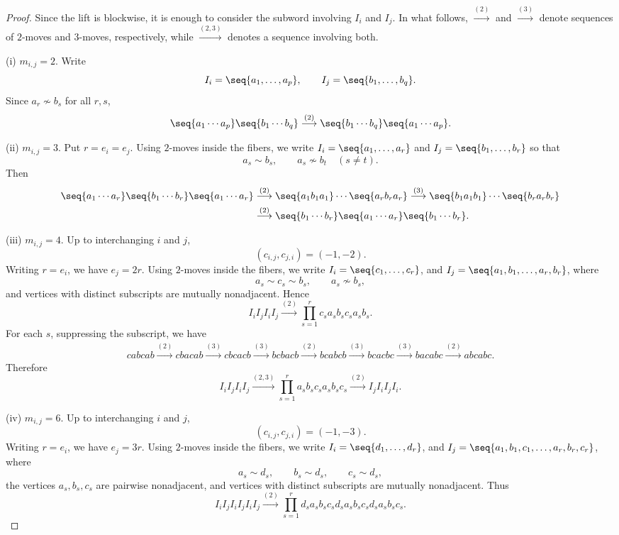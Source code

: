 \documentclass[12pt, leqno]{amsart}
\numberwithin{equation}{section}
\theoremstyle{plain}
\theoremstyle{definition}
\begin{document}
\begin{proof}
Since the lift is blockwise, it is enough to consider the subword
involving $I_i$ and $I_j$. In what follows,
$\overset{(2)}{\longrightarrow}$ and
$\overset{(3)}{\longrightarrow}$ denote sequences of $2$-moves and
$3$-moves, respectively, while
$\overset{(2,3)}{\longrightarrow}$ denotes a sequence involving both.

\smallskip
\noindent
{\rm (i) $m_{i,j}=2$.}
Write
\[
I_i=\seq{a_1,\ldots,a_p}, \qquad I_j=\seq{b_1,\ldots,b_q}.
\]
Since $a_r\not\sim b_s$ for all $r,s$,
\[
\seq{a_1\cdots a_p}\seq{b_1\cdots b_q} \overset{(2)}{\longrightarrow} \seq{b_1\cdots b_q}\seq{a_1\cdots a_p}.
\]

\smallskip
\noindent
{\rm (ii) $m_{i,j}=3$.}
Put $r=e_i=e_j$. Using $2$-moves inside the fibers, we write
$I_i=\seq{a_1,\ldots,a_r}$ and
$I_j=\seq{b_1,\ldots,b_r}$
so that
\[
a_s\sim b_s,
\qquad
a_s\not\sim b_t\quad(s\neq t).
\]
Then
\begin{align*}
\seq{a_1\cdots a_r}\seq{b_1\cdots b_r}\seq{a_1\cdots a_r}
&\overset{(2)}{\longrightarrow}
\seq{a_1b_1a_1}\cdots\seq{a_rb_ra_r}
\overset{(3)}{\longrightarrow}
\seq{b_1a_1b_1}\cdots\seq{b_ra_rb_r} \allowdisplaybreaks \\
&\overset{(2)}{\longrightarrow}
\seq{b_1\cdots b_r}\seq{a_1\cdots a_r}\seq{b_1\cdots b_r}.
\end{align*}

\smallskip
\noindent
{\rm (iii) $m_{i,j}=4$.}
Up to interchanging $i$ and $j$,
\[
(c_{i,j},c_{j,i})=(-1,-2).
\]
Writing $r=e_i$, we have $e_j=2r$. Using $2$-moves inside the fibers,
we write
$I_i=\seq{c_1,\ldots,c_r}$,
and
$I_j=\seq{a_1,b_1,\ldots,a_r,b_r}$,
where
\[
a_s\sim c_s\sim b_s, \qquad a_s\not\sim b_s,
\]
and vertices with distinct subscripts are mutually nonadjacent. Hence
\[
I_iI_jI_iI_j
\overset{(2)}{\longrightarrow}
\prod_{s=1}^r c_sa_sb_sc_sa_sb_s.
\]
For each $s$, suppressing the subscript, we have
\begin{align*}
cabcab
\overset{(2)}{\longrightarrow}cbacab
\overset{(3)}{\longrightarrow}cbcacb
\overset{(3)}{\longrightarrow}bcbacb
\overset{(2)}{\longrightarrow}bcabcb
\overset{(3)}{\longrightarrow}bcacbc
\overset{(3)}{\longrightarrow}bacabc
\overset{(2)}{\longrightarrow}abcabc .
\end{align*}
Therefore
\[
I_iI_jI_iI_j \overset{(2,3)}{\longrightarrow} \prod_{s=1}^r a_sb_sc_sa_sb_sc_s \overset{(2)}{\longrightarrow} I_jI_iI_jI_i.
\]

\smallskip
\noindent
{\rm (iv) $m_{i,j}=6$.}
Up to interchanging $i$ and $j$,
\[
(c_{i,j},c_{j,i})=(-1,-3).
\]
Writing $r=e_i$, we have $e_j=3r$. Using $2$-moves inside the fibers,
we write
$I_i=\seq{d_1,\ldots,d_r}$,
and
$I_j=\seq{a_1,b_1,c_1,\ldots,a_r,b_r,c_r}$,
where
\[
a_s\sim d_s,\qquad b_s\sim d_s,\qquad c_s\sim d_s,
\]
the vertices $a_s,b_s,c_s$ are pairwise nonadjacent, and vertices with
distinct subscripts are mutually nonadjacent. Thus
\[
I_iI_jI_iI_jI_iI_j \overset{(2)}{\longrightarrow} \prod_{s=1}^r d_sa_sb_sc_sd_sa_sb_sc_sd_sa_sb_sc_s.
\]


\end{proof}
\end{document}
